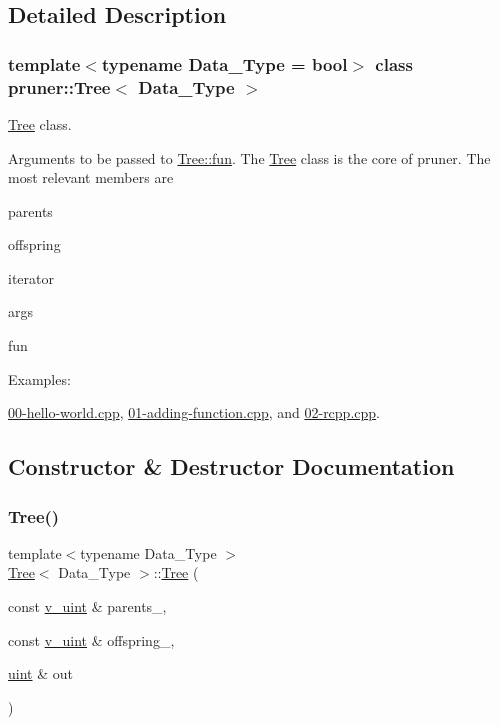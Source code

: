 \subsection{Detailed Description}
\subsubsection*{template$<$typename Data\+\_\+\+Type = bool$>$\newline
class pruner\+::\+Tree$<$ Data\+\_\+\+Type $>$}

\hyperlink{classpruner_1_1Tree}{Tree} class. 

Arguments to be passed to \hyperlink{classpruner_1_1Tree_adc2f509b8bf17ba16364632c17870c87}{Tree\+::fun}. The \hyperlink{classpruner_1_1Tree}{Tree} class is the core of pruner. The most relevant members are
\begin{DoxyItemize}
\item {\ttfamily parents}
\item {\ttfamily offspring}
\item {\ttfamily iterator}
\item {\ttfamily args}
\item {\ttfamily fun} 
\end{DoxyItemize}\begin{Desc}
\item[Examples\+: ]\par
\hyperlink{00-hello-world_8cpp-example}{00-\/hello-\/world.\+cpp}, \hyperlink{01-adding-function_8cpp-example}{01-\/adding-\/function.\+cpp}, and \hyperlink{02-rcpp_8cpp-example}{02-\/rcpp.\+cpp}.\end{Desc}


\subsection{Constructor \& Destructor Documentation}
\mbox{\label{classpruner_1_1Tree_a792b1c2d2a658a43a1c9098514c7b193}} 
\subsubsection{\texorpdfstring{Tree()}{Tree()}}
{\footnotesize\ttfamily template$<$typename Data\+\_\+\+Type $>$ \\
\hyperlink{classpruner_1_1Tree}{Tree}$<$ Data\+\_\+\+Type $>$\+::\hyperlink{classpruner_1_1Tree}{Tree} (\begin{DoxyParamCaption}\item[{const \hyperlink{namespacepruner_af0145646bd7ede012cd336b416bc5579}{v\+\_\+uint} \&}]{parents\+\_\+,  }\item[{const \hyperlink{namespacepruner_af0145646bd7ede012cd336b416bc5579}{v\+\_\+uint} \&}]{offspring\+\_\+,  }\item[{\hyperlink{namespacepruner_a659e6e64a9e2b8e981c3d34262a2f67e}{uint} \&}]{out }\end{DoxyParamCaption})\hspace{0.3cm}{\ttfamily [inline]}}



